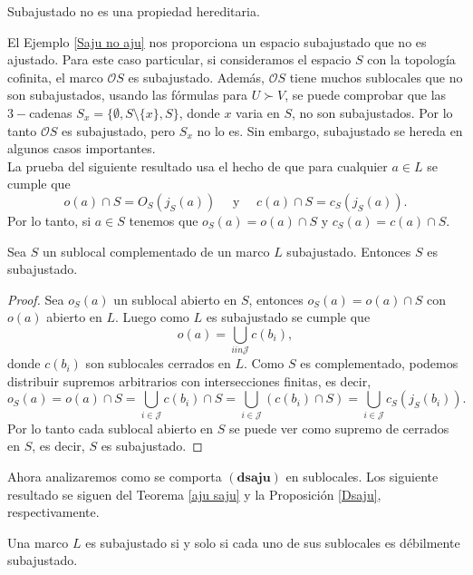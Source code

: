 \documentclass{comunicaciones}
\begin{document}
\begin{cor}\label{saju no saju}
    Subajustado no es una propiedad hereditaria. 
\end{cor}

El Ejemplo \ref{Saju no aju} nos proporciona un espacio subajustado que no es ajustado. Para este caso particular, si consideramos el espacio $S$ con la topología cofinita, el marco $\mathcal{O}S$ es subajustado. Además, $\mathcal{O}S$ tiene muchos sublocales que no son subajustados, usando las fórmulas para $U\succ V$, se puede comprobar que las $3-$cadenas $S_x=\{\emptyset, S\setminus \{x\}, S\}$, donde $x$ varia en $S$, no son subajustados. Por lo tanto $\mathcal{O}S$ es subajustado, pero $S_x$ no lo es. Sin embargo, subajustado se hereda en algunos casos importantes.\\

La prueba del siguiente resultado usa el hecho de que para cualquier $a\in L$ se cumple que 
\[
o(a)\cap S=O_S(j_S(a))\quad\mbox{ y }\quad c(a)\cap S=c_S(j_S(a)).
\]
Por lo tanto, si $a\in S$ tenemos que $o_S(a)=o(a)\cap S$ y $c_S(a)=c(a)\cap S$.

\begin{thm}\label{saju complementado}
    Sea $S$ un sublocal complementado de un marco $L$ subajustado. Entonces $S$ es subajustado.
\end{thm}

\begin{proof}
    Sea $o_S(a)$ un sublocal abierto en $S$, entonces $o_S(a)=o(a)\cap S$ con $o(a)$ abierto en $L$. Luego como $L$ es subajustado se cumple que 
    \[
    o(a)=\bigcup_{iin \mathcal{J}} c(b_i),
    \]
    donde $c(b_i)$ son sublocales cerrados en $L$. Como $S$ es complementado, podemos distribuir supremos arbitrarios con intersecciones finitas, es decir, 
    \[
    o_S(a)=o(a)\cap S=\bigcup_{i\in \mathcal{J}}c(b_i)\cap S=\bigcup_{i\in \mathcal{J}}(c(b_i)\cap S)=\bigcup_{i\in \mathcal{J}}c_S(j_S(b_i)).
    \]
    Por lo tanto cada sublocal abierto en $S$ se puede ver como supremo de cerrados en $S$, es decir, $S$ es subajustado. 
\end{proof}

Ahora analizaremos como se comporta $(\mathbf{dsaju})$ en sublocales. Los siguiente resultado se siguen del Teorema \ref{aju saju} y la Proposición \ref{Dsaju}, respectivamente.

\begin{cor}\label{Aju dsaju}
    Una marco $L$ es subajustado si y solo si cada uno de sus sublocales es débilmente subajustado.
\end{cor}
\end{document}
